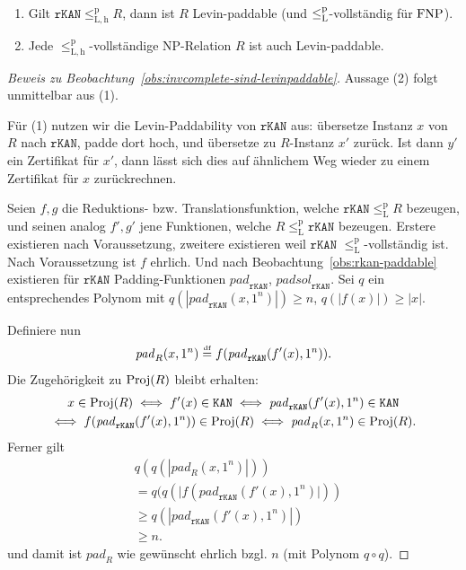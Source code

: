 \begin{lemma}\label{obs:invcomplete-sind-levinpaddable}
    \begin{enumerate}
        \item Gilt $\mathtt{rKAN}\leq_\mathrm{L,h}^\mathrm{p} R$, dann ist $R$ Levin-paddable (und $\leq_\mathrm{L}^\mathrm{p}$-vollständig für $\mathrm{FNP}$).
        \item Jede $\leq_\mathrm{L,h}^\mathrm{p}$-vollständige NP-Relation $R$ ist auch Levin-paddable.
    \end{enumerate}
\end{lemma}
\begin{proof}[Beweis zu Beobachtung~\ref{obs:invcomplete-sind-levinpaddable}]
    Aussage (2) folgt unmittelbar aus (1).

    Für (1) nutzen wir die Levin-Paddability von $\mathtt{rKAN}$ aus: übersetze Instanz $x$ von $R$ nach $\mathtt{rKAN}$, padde dort hoch, und übersetze zu $R$-Instanz $x'$ zurück. Ist dann $y'$ ein Zertifikat für $x'$, dann lässt sich dies auf ähnlichem Weg wieder zu einem Zertifikat für $x$ zurückrechnen.

    Seien $f, g$ die Reduktions- bzw. Translationsfunktion, welche $\mathtt{rKAN}\leq_\mathrm{L}^\mathrm p R$ bezeugen, und seinen analog $f', g'$ jene Funktionen, welche $R\leq_\mathrm{L}^\mathrm p \mathtt{rKAN}$ bezeugen. Erstere existieren nach Voraussetzung, zweitere existieren weil $\mathtt{rKAN}$ $\leq_\mathrm{L}^\mathrm p$-vollständig ist.
    Nach Voraussetzung ist $f$ ehrlich. %
    Und nach Beobachtung~\ref{obs:rkan-paddable} existieren für $\mathtt{rKAN}$ Padding-Funktionen $\mathit{pad}_\mathtt{rKAN}$, $\mathit{padsol}_\mathtt{rKAN}$.
    Sei $q$ ein entsprechendes Polynom mit $q(|\mathit{pad}_\mathtt{rKAN}(x, 1^n)|)\geq n$, $q(|f(x)|) \geq |x|$.

    Definiere nun
    \[ \mathit{pad}_R(x, 1^n) \stackrel{\text{\smash{\tiny df}}}{=}  f(\mathit{pad}_\mathtt{rKAN}(f'(x), 1^n)). \]
    Die Zugehörigkeit zu $\operatorname{Proj}(R)$ bleibt erhalten:
    \begin{gather*}
        x\in \operatorname{Proj}(R) \iff f'(x) \in \mathtt{KAN} \iff \mathit{pad}_\mathtt{rKAN}(f'(x), 1^n) \in \mathtt{KAN}\\ \iff f(\mathit{pad}_\mathtt{rKAN}(f'(x), 1^n)) \in \operatorname{Proj}(R) \iff \mathit{pad}_R(x, 1^n) \in\operatorname{Proj}(R).
    \end{gather*}
    Ferner gilt
    \begin{align*} &q(q(|\mathit{pad}_R(x, 1^n)|)) \\&= q(q(|f(\mathit{pad}_\mathtt{rKAN}(f'(x), 1^n)|))\\&\geq q(|\mathit{pad}_\mathtt{rKAN}(f'(x), 1^n)|)\\ &\geq n.
    \end{align*}
    und damit ist $\mathit{pad}_R$ wie gewünscht ehrlich bzgl. $n$ (mit Polynom $q\circ q$).


\end{proof}
